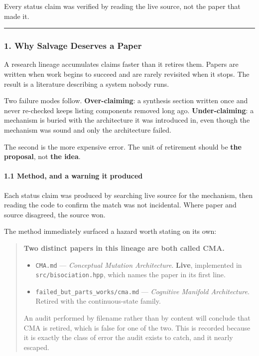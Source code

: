 \documentclass[
  11pt,
  a4paper,
]{article}
\providecommand{\tightlist}{%
  \setlength{\itemsep}{0pt}\setlength{\parskip}{0pt}}
\begin{document}
Every status claim was verified by reading the live source, not the
paper that made it.

\begin{center}\rule{0.5\linewidth}{0.5pt}\end{center}

\subsubsection{1. Why Salvage Deserves a
Paper}\label{why-salvage-deserves-a-paper}

A research lineage accumulates claims faster than it retires them.
Papers are written when work begins to succeed and are rarely revisited
when it stops. The result is a literature describing a system nobody
runs.

Two failure modes follow. \textbf{Over-claiming}: a synthesis section
written once and never re-checked keeps listing components removed long
ago. \textbf{Under-claiming}: a mechanism is buried with the
architecture it was introduced in, even though the mechanism was sound
and only the architecture failed.

The second is the more expensive error. The unit of retirement should be
\textbf{the proposal}, not \textbf{the idea}.

\paragraph{1.1 Method, and a warning it
produced}\label{method-and-a-warning-it-produced}

Each status claim was produced by searching live source for the
mechanism, then reading the code to confirm the match was not
incidental. Where paper and source disagreed, the source won.

The method immediately surfaced a hazard worth stating on its own:

\begin{quote}
\textbf{Two distinct papers in this lineage are both called CMA.}

\begin{itemize}
\tightlist
\item
  \texttt{CMA.md} --- \emph{Conceptual Mutation Architecture}.
  \textbf{Live}, implemented in \texttt{src/bisociation.hpp}, which
  names the paper in its first line.
\item
  \texttt{failed\_but\_parts\_works/cma.md} --- \emph{Cognitive Manifold
  Architecture}. Retired with the continuous-state family.
\end{itemize}

An audit performed by filename rather than by content will conclude that
CMA is retired, which is false for one of the two. This is recorded
because it is exactly the class of error the audit exists to catch, and
it nearly escaped.
\end{quote}
\end{document}
